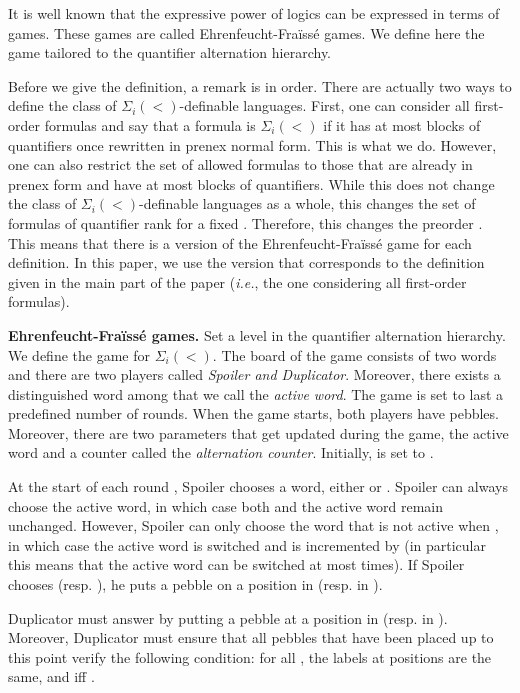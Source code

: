 \documentclass[envcountsame]{llncs}
\newcommand{\efgame}{Ehrenfeucht-Fra\"iss\'e\xspace}
\newcommand{\siw}[1]{\ensuremath{\Sigma_{#1}(<)}\xspace}
\begin{document}
It is well known that the expressive power of logics can be
expressed in terms of games. These games are called \efgame games. We
define here the game tailored to the quantifier alternation hierarchy.

Before we give the definition, a remark is in order. There are actually two
ways to define the class of \siw{i}-definable languages.  First, one can
consider all first-order formulas and say that a formula is \siw{i} if it has
at most  blocks of quantifiers once rewritten in prenex normal form. This
is what we do. However, one can also restrict the set of allowed formulas to
those that are already in prenex form and have at most  blocks of
quantifiers. While this does not change the class of \siw{i}-definable
languages as a whole, this changes the set of formulas of quantifier rank 
for a fixed . Therefore, this changes the preorder . This means
that there is a version of the \efgame game for each definition. In this
paper, we use the version that corresponds to the definition given in the
main part of the paper (\emph{i.e.}, the one considering all first-order formulas).

\medskip
\noindent
{\bf \efgame games.} Set  a level in the quantifier alternation
hierarchy. We define the game for \siw{i}. The board of the game
consists of two words  and there are two players called
\emph{Spoiler and Duplicator}. Moreover, there exists a
distinguished word among  that we call the \emph{active
  word}. The game is set to last a predefined number  of
rounds. When the game starts, both players have  pebbles. Moreover,
there are two parameters that get updated during the game, the active
word and a counter  called the \emph{alternation counter}. Initially,  is
set to .

At the start of each round , Spoiler chooses a word, either  or
. Spoiler can always choose the active word, in which case both 
and the active word remain unchanged. However, Spoiler can only choose the
word that is not active when , in which case the active
word is switched and  is incremented by  (in particular this
means that the active word can be switched at most  times). If
Spoiler chooses  (resp. ), he puts a pebble on a position  in
 (resp.  in ).

Duplicator must answer by putting a pebble at a position  in
 (resp.  in ). Moreover, Duplicator must ensure that all
pebbles that have been placed up to this point verify the following
condition: for all  , the labels at positions
 are the same, and  iff .  
\end{document}
